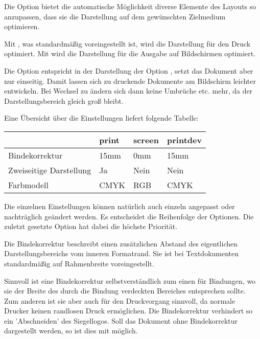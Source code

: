 \begin{Declaration}
\end{Declaration}

Die Option  bietet die automatische Möglichkeit diverse Elemente
des Layouts so anzupassen, dass sie die Darstellung auf dem gewünschten
Zielmedium optimieren.

Mit , was standardmäßig voreingestellt ist,
wird die Darstellung für den Druck optimiert.
Mit  wird die Darstellung
für die Ausgabe auf Bildschirmen optimiert.

Die Option  entspricht in der Darstellung
der Option , setzt das Dokument aber nur einseitig.
Damit lassen sich zu druckende Dokumente am Bildschirm leichter entwickeln.
Bei Wechsel zu  ändern sich dann keine Umbrüche etc.
mehr, da der Darstellungsbereich gleich groß bleibt.

Eine Übersicht über die Einstellungen liefert folgende Tabelle:

\begin{center}
\begin{tabular}{llll}
  & \textbf{\ttfamily print} & \textbf{\ttfamily screen} & \textbf{\ttfamily printdev} \\
  \midrule
Bindekorrektur          & 15mm  & 0mm   & 15mm\\
Zweiseitige Darstellung & Ja    & Nein  & Nein\\
Farbmodell              & CMYK  & RGB   & CMYK
\end{tabular}
\end{center}

Die einzelnen Einstellungen können natürlich auch einzeln angepasst oder
nachträglich geändert werden. Es entscheidet die Reihenfolge der Optionen.
Die zuletzt gesetzte Option hat dabei die höchste Priorität.

\begin{Declaration}
\end{Declaration}

Die Bindekorrektur beschreibt einen zusätzlichen Abstand des eigentlichen
Darstellungsbereichs vom inneren Formatrand.
Sie ist bei Textdokumenten standardmäßig auf Rahmenbreite voreingestellt.

Sinnvoll ist eine Bindekorrektur selbstverständlich zum einen für Bindungen,
wo sie der Breite des durch die Bindung verdeckten Bereiches entsprechen sollte.
Zum anderen ist sie aber auch für den Druckvorgang sinnvoll, da normale Drucker
keinen randlosen Druck ermöglichen.
Die Bindekorrektur verhindert so \zB ein 'Abschneiden' des Siegellogos.
Soll das Dokument ohne Bindekorrektur dargestellt werden, so ist dies
mit  möglich.

